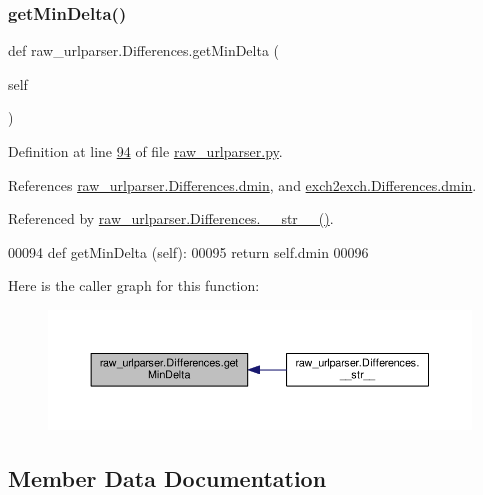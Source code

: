 \subsubsection{\texorpdfstring{get\+Min\+Delta()}{getMinDelta()}}
{\footnotesize\ttfamily def raw\+\_\+urlparser.\+Differences.\+get\+Min\+Delta (\begin{DoxyParamCaption}\item[{}]{self }\end{DoxyParamCaption})}



Definition at line \hyperlink{raw__urlparser_8py_source_l00094}{94} of file \hyperlink{raw__urlparser_8py_source}{raw\+\_\+urlparser.\+py}.



References \hyperlink{raw__urlparser_8py_source_l00090}{raw\+\_\+urlparser.\+Differences.\+dmin}, and \hyperlink{exch2exch_8py_source_l00116}{exch2exch.\+Differences.\+dmin}.



Referenced by \hyperlink{raw__urlparser_8py_source_l00100}{raw\+\_\+urlparser.\+Differences.\+\_\+\+\_\+str\+\_\+\+\_\+()}.


\begin{DoxyCode}
00094     \textcolor{keyword}{def }getMinDelta (self):
00095         \textcolor{keywordflow}{return} self.dmin
00096         
\end{DoxyCode}
Here is the caller graph for this function\+:
\nopagebreak
\begin{figure}[H]
\begin{center}
\leavevmode
\includegraphics[width=350pt]{classraw__urlparser_1_1_differences_af19faaea85ca8ac0d327c8443ddd99ef_icgraph}
\end{center}
\end{figure}


\subsection{Member Data Documentation}
\mbox{\label{classraw__urlparser_1_1_differences_ad2b06158b655136bc7743dc6ac8d1e2a}} 
